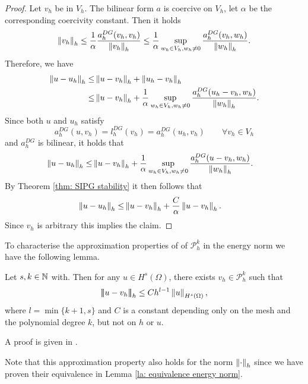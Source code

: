 \begin{proof}
	Let $v_h$ be in $V_h$.
	The bilinear form $a$ is coercive on $V_h$, let $\alpha$ be the corresponding coercivity constant. 
	Then it holds
	\[
		\left\lVert v_h \right\rVert_{h} \leq \frac 1 \alpha \frac {a_h^{DG}(v_h, v_h)} {\left\lVert v_h \right\rVert_{h}} 
		 \leq \frac 1 \alpha \sup_{w_h \in V_h, w_h \neq 0} \frac {a_h^{DG}(v_h,w_h)} {\left\lVert w_h \right\rVert_{h}}.
	\]
	Therefore, we have
	\begin{align*}
	\left\lVert u-u_h \right\rVert_{h} \leq& \left\lVert u-v_h \right\rVert_{h} + \left\lVert u_h-v_h \right\rVert_{h} \\
	\leq& \left\lVert u-v_h \right\rVert_{h} + \frac 1 \alpha \sup_{w_h \in V_h, w_h \neq 0} \frac {a_h^{DG}(u_h-v_h, w_h) }{\left\lVert w_h \right\rVert_{h}}.
	\end{align*}
	Since both $u$ and $u_h$ satisfy
	\[
	a_h^{DG}(u,v_h) = l_h^{DG}(v_h) = a_h^{DG}(u_h,v_h) \qquad \forall v_h \in V_h
	\]
	and $a_h^{DG}$ is bilinear, it holds that
	\begin{align*}
	\left\lVert u-u_h \right\rVert_{h} \leq& \left\lVert u-v_h \right\rVert_{h} + \frac 1 \alpha \sup_{w_h \in V_h, w_h \neq 0} \frac {a_h^{DG}(u-v_h, w_h) }{\left\lVert w_h \right\rVert_{h}}.
	\end{align*}
	By Theorem \ref{thm: SIPG stability} it then follows that
	\begin{align*}
	\left\lVert u-u_h \right\rVert_{h} \leq& \left\lVert u-v_h \right\rVert_{h} + \frac C \alpha \left\lVert u-v_h \right\rVert_{h}.
	\end{align*}
	Since $v_h$ is arbitrary this implies the claim.
\end{proof}

To characterise the approximation properties of of $\mathcal P_h^k$ in the energy norm we have the following lemma.
\begin{lemma}  \label{la: approximation properties energy norm}
Let $s,k \in \mathbb{N}$ with. Then for any $u \in H^s(\Omega)$, there exists $v_h \in \mathcal P^k_h$ such that 
\[
	\left| \! \left| \! \left| u-v_h \right| \! \right| \! \right|_{h} \leq C h^{l-1} \left\lVert u \right\rVert_{H^{s}(\Omega)},
\]
where $l = \min\{k+1,s\}$  and $C$ is a constant depending only on the mesh and the polynomial degree $k$, but not on $h$ or $u$.
\end{lemma}
A proof is given in \cite[Section 4.1.1.]{PPO+2000}.

Note that this approximation property also holds for the norm $\left\lVert \cdot \right\rVert_{h}$ since we have proven their equivalence in Lemma \ref{la: equivalence energy norm}.


